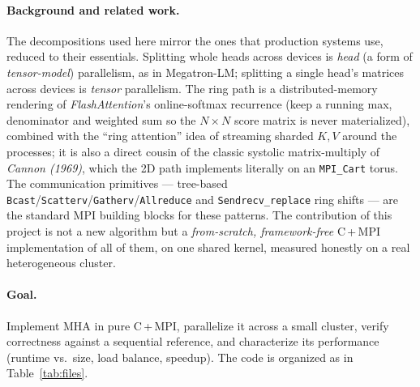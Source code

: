 \documentclass[11pt,a4paper]{article}
\newcommand{\code}[1]{\texttt{#1}}
\begin{document}
\paragraph{Background and related work.} The decompositions used here mirror the
ones that production systems use, reduced to their essentials. Splitting whole heads
across devices is \emph{head} (a form of \emph{tensor-model}) parallelism, as in
Megatron-LM; splitting a single head's matrices across devices is \emph{tensor}
parallelism. The ring path is a distributed-memory rendering of
\emph{FlashAttention}'s online-softmax recurrence (keep a running max, denominator
and weighted sum so the $N\times N$ score matrix is never materialized), combined
with the ``ring attention'' idea of streaming sharded $K,V$ around the processes;
it is also a direct cousin of the classic systolic matrix-multiply of
\emph{Cannon (1969)}, which the 2D path implements literally on an
\code{MPI\_Cart} torus. The communication primitives --- tree-based
\code{Bcast}/\code{Scatterv}/\code{Gatherv}/\code{Allreduce} and
\code{Sendrecv\_replace} ring shifts --- are the standard MPI building blocks for
these patterns. The contribution of this project is not a new algorithm but a
\emph{from-scratch, framework-free} C\,+\,MPI implementation of all of them, on one
shared kernel, measured honestly on a real heterogeneous cluster.

\paragraph{Goal.} Implement MHA in pure C\,+\,MPI, parallelize it across a small
cluster, verify correctness against a sequential reference, and characterize its
performance (runtime vs.\ size, load balance, speedup). The code is organized as
in Table~\ref{tab:files}.
\end{document}
